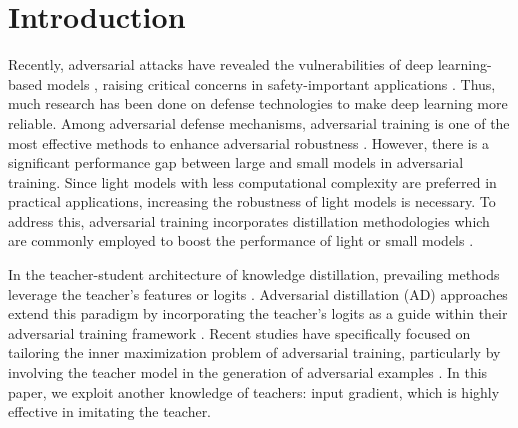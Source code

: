 
\section{Introduction}
\label{sec:intro}

Recently, adversarial attacks have revealed the vulnerabilities of deep learning-based models \citep{FGSM, PGD, CW_attack}, raising critical concerns in safety-important applications \citep{safe1,safe2,wang2023does}.
Thus, much research has been done on defense technologies to make deep learning more reliable\citep{2017_jpeg_defense, xie2019feature, cohen2019certified, carmon2019unlabeled, zhang2022adversarial, jin2023randomized}.
Among adversarial defense mechanisms, adversarial training is one of the most effective methods to enhance adversarial robustness \citep{pang2020bag, bai2021recent, wei2023cfa}.
However, there is a significant performance gap between large and small models in adversarial training.
Since light models with less computational complexity are preferred in practical applications, increasing the robustness of light models is necessary.
To address this, adversarial training incorporates distillation methodologies which are commonly employed to boost the performance of light or small models \citep{ard,rslad,iad,adaad}.

In the teacher-student architecture of knowledge distillation, prevailing methods leverage the teacher's features or logits \citep{hinton2015distilling, ji2021show, kim2021feature, yang2022focal}. Adversarial distillation (AD) approaches extend this paradigm by incorporating the teacher's logits as a guide within their adversarial training framework \citep{ard, iad, rslad, akd, adaad}. Recent studies have specifically focused on tailoring the inner maximization problem of adversarial training, particularly by involving the teacher model in the generation of adversarial examples \citep{rslad, adaad}.
In this paper, we exploit another knowledge of teachers: input gradient, which is highly effective in imitating the teacher.

